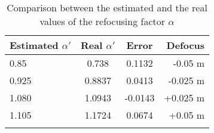 \begin{table}
 	\label{tab:alphaest}
 	\begin{center}
  \begin{tabular}{l|c|c|r}
  	\hline
  	Estimated $ \alpha'$ & Real $ \alpha'$ & Error & Defocus \\ \hline
  	0.85 & 0.738 & 0.1132 & -0.05 m\\ \hline
  	0.925 & 0.8837 & 0.0413 & -0.025 m\\ \hline 
  	1.080 & 1.0943 & -0.0143 & +0.025 m\\ \hline
  	1.105 & 1.1724 & 0.0674 & +0.05 m\\ \hline
  	\label{tab:2}
  \end{tabular}
\end{center}
  \caption{Comparison between the estimated and the real values of the refocusing factor $ \alpha$ }
 \end{table}

